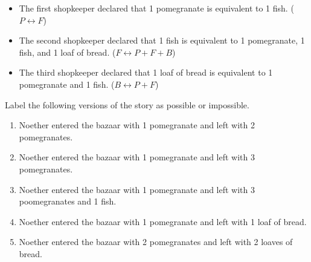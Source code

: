 \begin{itemize}
\item The first shopkeeper declared that 1 pomegranate is equivalent to 1 fish. (\(P \leftrightarrow F\))
\item The second shopkeeper declared that 1 fish is equivalent to 1 pomegranate, 1 fish, and 1 loaf of bread. (\(F \leftrightarrow P + F + B\))
\item The third shopkeeper declared that 1 loaf of bread is equivalent to 1 pomegranate and 1 fish. (\(B \leftrightarrow P + F\))
\end{itemize}

Label the following versions of the story as possible or impossible.
\begin{enumerate}
\item Noether entered the bazaar with 1 pomegranate and left with 2 pomegranates.
\item Noether entered the bazaar with 1 pomegranate and left with 3 pomegranates.
\item Noether entered the bazaar with 1 pomegranate and left with 3 poomegranates and 1 fish.
\item Noether entered the bazaar with 1 pomegranate and left with 1 loaf of bread.
\item Noether entered the bazaar with 2 pomegranates and left with 2 loaves of bread.
\end{enumerate}
